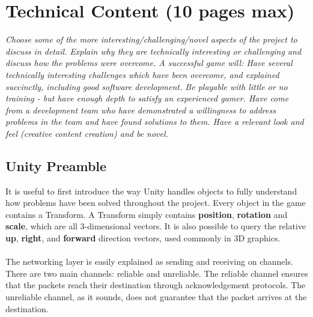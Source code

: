 \documentclass[11pt,a4paper]{article}
\begin{document}
\pagebreak


 \section{Technical Content (10 pages max)}

 \textit{Choose some of the more interesting/challenging/novel aspects of the project to discuss in detail. Explain why they are technically interesting or challenging and discuss how the problems were overcome. A successful game will:
 Have several technically interesting challenges which have been overcome, and explained succinctly, including good software development.
 Be playable with little or no training - but have enough depth to satisfy an experienced gamer.
 Have come from a development team who have demonstrated a willingness to address problems in the team and have found solutions to them.
 Have a relevant look and feel (creative content creation) and be novel.}

 \subsection{Unity Preamble}
 It is useful to first introduce the way Unity handles objects to fully understand how problems have been solved throughout the project. 
 Every object in the game contains a Transform. A Transform simply contains \textbf{position}, \textbf{rotation} and \textbf{scale}, which are all 3-dimensional vectors. It is also possible to query the relative \textbf{up}, \textbf{right}, and \textbf{forward} direction vectors, used commonly in 3D graphics. \\ \\
\noindent
 The networking layer is easily explained as sending and receiving on channels. There are two main channels: reliable and unreliable. The reliable channel ensures that the packets reach their destination through acknowledgement protocols. The unreliable channel, as it sounds, does not guarantee that the packet arrives at the destination.
 
\end{document}
